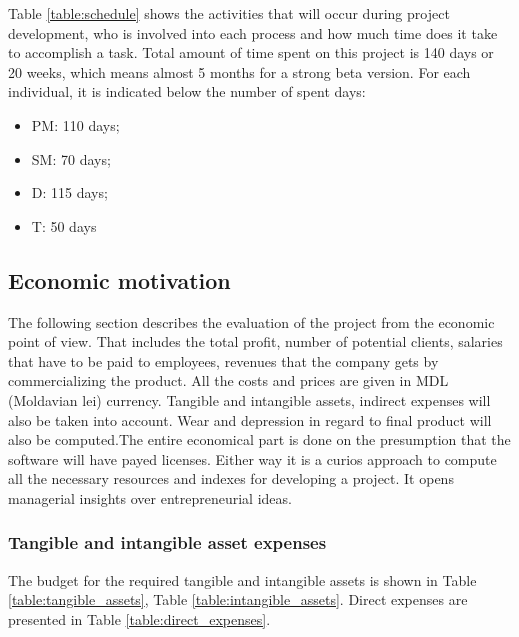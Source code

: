 Table \ref{table:schedule} shows the activities that will occur during project development, who is involved into each process and how much time does it take to accomplish a task. Total amount of time spent on this project is 140 days or 20 weeks, which means almost 5 months for a strong beta version.
For each individual, it is indicated below the number
of spent days:
 \begin{itemize}
 \item PM: 110 days;
 \item SM: 70 days;
 \item D: 115 days;
 \item T: 50 days
\end{itemize}

\subsection{Economic motivation}
The following section describes the evaluation of the project from the economic point of view. That includes the total profit, number of potential clients, salaries that have to be paid to employees, revenues that the company gets by commercializing the product. All the costs and prices are given in MDL (Moldavian lei) currency. Tangible and intangible assets, indirect expenses will also be taken into account. Wear and depression in regard to final product will also be computed.The entire economical part is done on the presumption that the software will have payed licenses. Either way it is a curios approach to compute all the necessary resources and indexes for developing a project. It opens managerial insights over entrepreneurial ideas.


\subsubsection{Tangible and intangible asset expenses}
The budget for the required tangible and intangible assets is shown in Table \ref{table:tangible_assets}, Table \ref{table:intangible_assets}. Direct expenses are presented in Table \ref{table:direct_expenses}.

